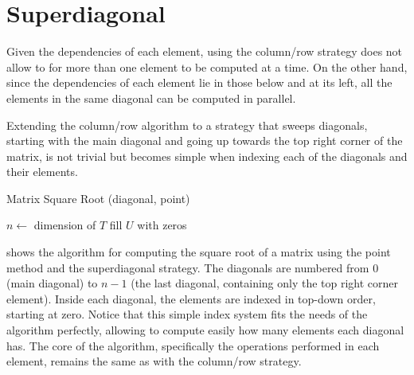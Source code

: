\documentclass[../thesis]{subfiles}
\begin{document}
		\section{Superdiagonal}
		Given the dependencies of each element, using the column/row strategy does not allow to for more than one element to be computed at a time. On the other hand, since the dependencies of each element lie in those below and at its left, all the elements in the same diagonal can be computed in parallel.

		Extending the column/row algorithm to a strategy that sweeps diagonals, starting with the main diagonal and going up towards the top right corner of the matrix, is not trivial but becomes simple when indexing each of the diagonals and their elements.

		\begin{algorithm}[htp]
			\caption{Matrix Square Root (diagonal, point)}
			\label{alg:multicore:diagonal:point}
			\DontPrintSemicolon


			$n \leftarrow$ dimension of $T$\;
			fill $U$ with zeros\;

		\end{algorithm}

		 shows the algorithm for computing the square root of a matrix using the point method and the superdiagonal strategy. The diagonals are numbered from $0$ (main diagonal) to $n-1$ (the last diagonal, containing only the top right corner element). Inside each diagonal, the elements are indexed in top-down order, starting at zero. Notice that this simple index system fits the needs of the algorithm perfectly, allowing to compute easily how many elements each diagonal has. The core of the algorithm, specifically the operations performed in each element, remains the same as with the column/row strategy.
\end{document}
